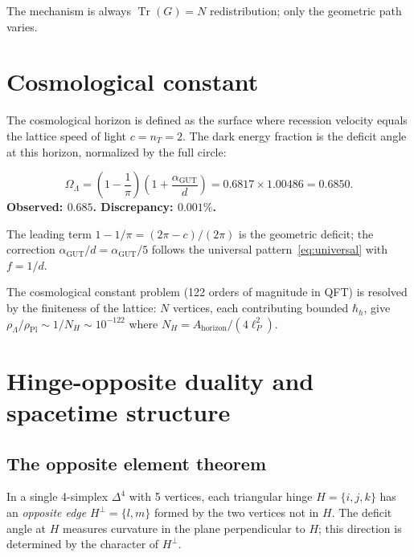 \documentclass[12pt,a4paper]{article}
\newcommand{\tr}{\operatorname{Tr}}
\newcommand{\agut}{\alpha_{\mathrm{GUT}}}
\newcommand{\nT}{n_T}
\begin{document}
The mechanism is always $\tr(G) = N$ redistribution; only the
geometric path varies.

\section{Cosmological constant}
\label{sec:lambda}

The cosmological horizon is defined as the surface where
recession velocity equals the lattice speed of light $c = \nT = 2$.
The dark energy fraction is the deficit angle at this horizon,
normalized by the full circle:

\begin{equation}
\boxed{\Omega_\Lambda
= \left(1 - \frac{1}{\pi}\right)
\left(1 + \frac{\agut}{d}\right)
= 0.6817 \times 1.00486 = 0.6850.}
\end{equation}
\textbf{Observed: $0.685$.  Discrepancy: $0.001\%$.}

The leading term $1 - 1/\pi = (2\pi - c)/(2\pi)$
is the geometric deficit; the correction
$\agut/d = \agut/5$ follows the universal
pattern~\eqref{eq:universal} with $f = 1/d$.

The cosmological constant problem (122 orders of magnitude
in QFT) is resolved by the finiteness of the lattice:
$N$ vertices, each contributing bounded $\hbar_h$, give
$\rho_\Lambda/\rho_{\mathrm{Pl}} \sim 1/N_H \sim 10^{-122}$
where $N_H = A_{\mathrm{horizon}}/(4\ell_P^2)$.

\section{Hinge-opposite duality and spacetime structure}
\label{sec:hinge-opposite}

\subsection{The opposite element theorem}

In a single 4-simplex $\Delta^4$ with 5 vertices, each
triangular hinge $H = \{i,j,k\}$ has an \emph{opposite edge}
$H^\perp = \{l,m\}$ formed by the two vertices not in $H$.
The deficit angle at $H$ measures curvature in the plane
perpendicular to $H$; this direction is determined by the
character of $H^\perp$.
\end{document}
